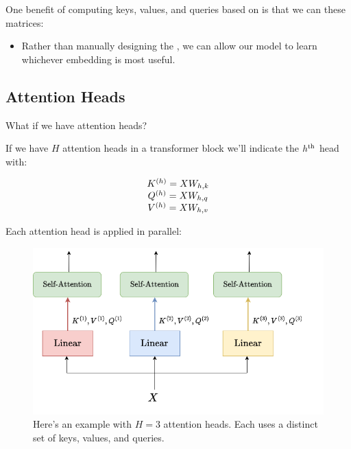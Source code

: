         \begin{concept}
            One benefit of computing keys, values, and queries based on  is that we can  these matrices: 

            \begin{itemize}
                \item Rather than manually designing the , we can allow our model to learn whichever embedding is most useful.
            \end{itemize}
        \end{concept}




    \phantom{}

    \subsection{Attention Heads}

        What if we have  attention heads?\\

        \begin{notation}
            If we have $H$ attention heads in a transformer block we'll indicate the $h^{ \text{th} }$ head with:

            $$
            \begin{matrix}
                K^{(h)} = XW_{h,k} \\
                Q^{(h)} = XW_{h,q} \\ 
                V^{(h)} = XW_{h,v} 
            \end{matrix}$$
        \end{notation}

        Each attention head is applied in parallel:

        \begin{figure}[H]
            \centering
            \includegraphics[width=0.5\linewidth]{images/transformers_images/multi_headed_attention.png}
            \caption*{Here's an example with $H=3$ attention heads. Each uses a distinct set of keys, values, and queries.}
        \end{figure}

